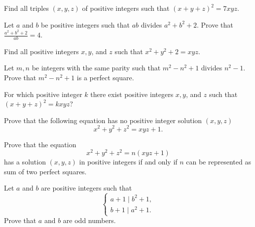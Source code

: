 \documentclass{subfile}
\begin{document}
	\begin{problem} %
		Find all triples $(x,y,z)$ of positive integers such that $(x+y+z)^2=7xyz$.
	\end{problem}

	\begin{problem} %
		 Let $a$ and $b$ be positive integers such that $ab$ divides $a^2 + b^2 + 2$. Prove that $\frac{a^2 + b^2 + 2}{ab} = 4$.
	\end{problem}

	\begin{problem} %
		Find all positive integers $x,y$, and $z$ such that $x^2+y^2+2=xyz$.
	\end{problem}

	\begin{problem}[Ireland 2005] %
		Let $m,n$ be integers with the same parity such that $m^2-n^2+1$ divides $n^2-1$. Prove that $m^2-n^2+1$ is a perfect square.
	\end{problem}

	\begin{problem}[Mongolia 2000] %
		For which positive integer $k$ there exist positive integers $x,y$, and $z$ such that $(x+y+z)^2= kxyz$?
	\end{problem}

	\begin{problem} %
		Prove that the following equation has no positive integer solution $(x,y,z)$ \[x^2+y^2+z^2=xyz+1.\]
	\end{problem}

	\begin{problem} %
		Prove that the equation \[x^2+y^2+z^2=n(xyz+1)\] has a solution $(x,y,z)$ in positive integers if and only if $n$ can be represented as sum of two perfect squares.
	\end{problem}

	\begin{problem} %
		Let $a$ and $b$ are positive integers such that \[\left\{ \begin{array}{l} a + 1\mid {b^2} + 1,\\ b + 1\mid{a^2} + 1. \end{array} \right.\] Prove that $a$ and $b$ are odd numbers.
	\end{problem}
\end{document}
